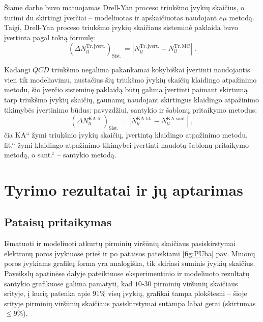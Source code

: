 \documentclass[a4paper, 12pt, oneside]{article}
\newcommand{\emu}{e\mu}
\newcommand{\ltq}[1]{{\quotedblbase{}#1\textquotedblleft{}}}
\newlength\q
\begin{document}
Šiame darbe buvo matuojamas Drell-Yan proceso triukšmo įvykių skaičius, o turimi du skirtingi įverčiai -- modeliuotas ir
apskaičiuotas naudojant $\emu$ metodą.
Taigi, Drell-Yan proceso triukšmo įvykių skaičiaus sisteminė paklaida buvo įvertinta pagal tokią formulę:
\begin{equation}
	(\Delta N_{ll}^{\mathrm{Tr. \, įvert.}})_{\mathrm{Sist.\,}} = | N_{ll}^{\mathrm{Tr. \, įvert.}} -
	N_{ll}^{\mathrm{Tr. \, MC}} | \; .
	\label{eq:systUncEmu}
\end{equation}

Kadangi $QCD$ triukšmo negalima pakankamai kokybiškai įvertinti naudojantis vien tik modeliavimu, nustačius šių triukšmo
įvykių skaičių klaidingo atpažinimo metodu, šio įverčio sisteminę paklaidą būtų galima įvertinti paimant skirtumą tarp triukšmo įvykių skaičių,
gaunamų naudojant skirtingus klaidingo atpažinimo tikimybės įvertinimo būdus: pavyzdžiui, santykio ir šablonų pritaikymo metodus:
\begin{equation}
	(\Delta N_{ll}^{\mathrm{KA\; fit}})_{\mathrm{Sist.\,}} = | N_{ll}^{\mathrm{KA \; fit.}} -
	N_{ll}^{\mathrm{KA \; sant.}} | \; ,
	\label{eq:systUncFR}
\end{equation}
čia \ltq{KA} žymi triukšmo įvykių skaičių, įvertintą klaidingo atpažinimo metodu, \ltq{fit.} žymi klaidingo atpažinimo tikimybei
įvertinti naudotą šablonų pritaikymo metodą, o \ltq{sant.} -- santykio metodą.

\section{Tyrimo rezultatai ir jų aptarimas}

\subsection{Pataisų pritaikymas}
Išmatuoti ir modeliuoti atkurtų pirminių viršūnių skaičiaus pasiskirstymai elektronų poros įvykiuose
prieš ir po pataisos pateikiami \ref{fig:PUba} pav.
Miuonų poros įvykiams grafikų forma yra analogiška, tik skiriasi suminis įvykių skaičius.
Paveikslų apatinėse dalyje pateiktuose eksperimentinio ir modeliuoto rezultatų santykio grafikuose galima pamatyti, kad
$10$-$30$ pirminių viršūnių skaičiaus srityje, į kurią patenka apie $91\%$ visų įvykių, grafikai tampa plokštesni --
šioje srityje pirminių viršūnių skaičiaus pasiskirstymai sutampa labai gerai (skirtumas $\leqslant 9\%$).
\end{document}
